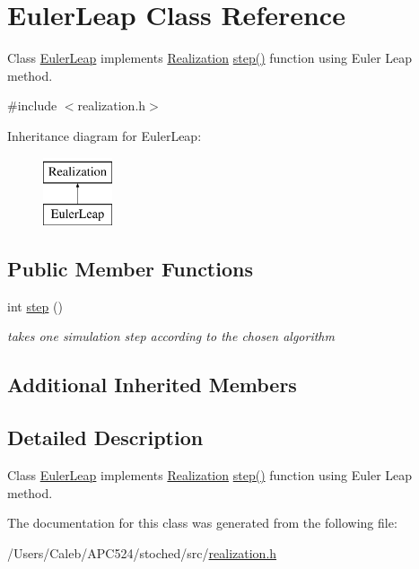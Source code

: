 \hypertarget{class_euler_leap}{}\section{Euler\+Leap Class Reference}
\label{class_euler_leap}


Class \hyperlink{class_euler_leap}{Euler\+Leap} implements \hyperlink{class_realization}{Realization} \hyperlink{class_euler_leap_a25b1ea90a95bfd41ecb919605683da9d}{step()} function using Euler Leap method.  




{\ttfamily \#include $<$realization.\+h$>$}

Inheritance diagram for Euler\+Leap\+:\begin{figure}[H]
\begin{center}
\leavevmode
\includegraphics[height=2.000000cm]{class_euler_leap}
\end{center}
\end{figure}
\subsection*{Public Member Functions}
\begin{DoxyCompactItemize}
\item 
\mbox{\label{class_euler_leap_a25b1ea90a95bfd41ecb919605683da9d}} 
int \hyperlink{class_euler_leap_a25b1ea90a95bfd41ecb919605683da9d}{step} ()
\begin{DoxyCompactList}\small\item\em takes one simulation step according to the chosen algorithm \end{DoxyCompactList}\end{DoxyCompactItemize}
\subsection*{Additional Inherited Members}


\subsection{Detailed Description}
Class \hyperlink{class_euler_leap}{Euler\+Leap} implements \hyperlink{class_realization}{Realization} \hyperlink{class_euler_leap_a25b1ea90a95bfd41ecb919605683da9d}{step()} function using Euler Leap method. 

The documentation for this class was generated from the following file\+:\begin{DoxyCompactItemize}
\item 
/\+Users/\+Caleb/\+A\+P\+C524/stoched/src/\hyperlink{realization_8h}{realization.\+h}\end{DoxyCompactItemize}

